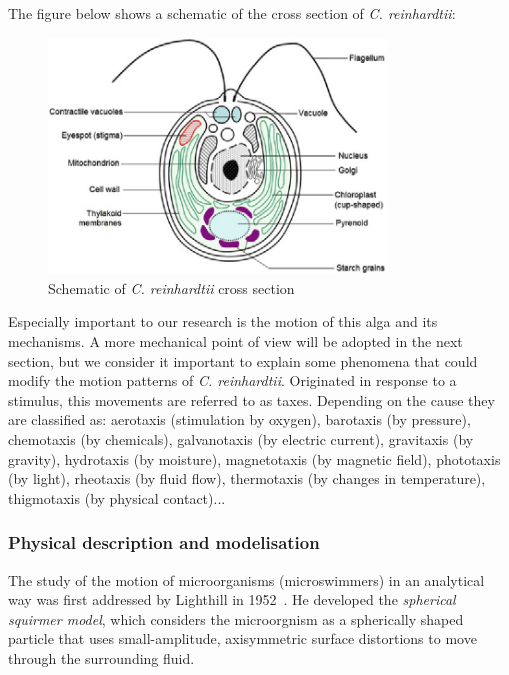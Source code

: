 The figure below shows a schematic of the cross section of \textit{C. reinhardtii}:

\begin{figure}[H]
	\centering
	\includegraphics[width=0.8\textwidth]{archivos/chlamy_illustration.png}
	\caption{Schematic of \textit{C. reinhardtii} cross section~\cite{chlamy_cs}
	}
	\label{chlamy_illustration}
\end{figure}

Especially important to our research is the motion of this alga and its mechanisms. A more mechanical point of view will be adopted in the next section, but we consider it important to explain some phenomena that could modify the motion patterns of \textit{C. reinhardtii}. Originated in response to a stimulus, this movements are referred to as taxes. Depending on the cause they are classified as: aerotaxis (stimulation by oxygen), barotaxis (by pressure), chemotaxis (by chemicals), galvanotaxis (by electric current), gravitaxis (by gravity), hydrotaxis (by moisture), magnetotaxis (by magnetic field), phototaxis (by light), rheotaxis (by fluid flow), thermotaxis (by changes in temperature), thigmotaxis (by physical contact)...

\subsubsection{Physical description and modelisation}
\label{phys_chlamy}

The study of the motion of microorganisms (microswimmers) in an analytical way was first addressed by Lighthill in 1952~\cite{Lighthill}. He developed the \textit{spherical squirmer model}, which considers the microorgnism as a spherically shaped particle that uses small-amplitude, axisymmetric surface distortions to move through the surrounding fluid.

